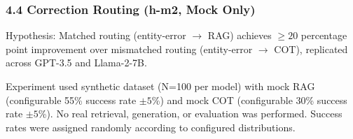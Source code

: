 \subsubsection{4.4 Correction Routing (h-m2, Mock Only)}

Hypothesis: Matched routing (entity-error $\rightarrow$ RAG) achieves $\geq 20$ percentage point improvement over mismatched routing (entity-error $\rightarrow$ COT), replicated across GPT-3.5 and Llama-2-7B.

Experiment used synthetic dataset (N=100 per model) with mock RAG (configurable 55\% success rate $\pm 5$\%) and mock COT (configurable 30\% success rate $\pm 5$\%). No real retrieval, generation, or evaluation was performed. Success rates were assigned randomly according to configured distributions.
